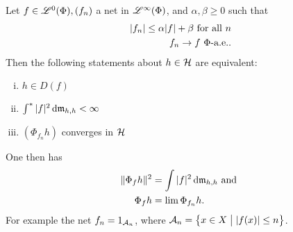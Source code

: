 \begin{lem}
  \label{maintheorem2}
Let $f \in \mathscr{L}^0(\Phi), (f_n)$ a net in $\mathscr{L}^\infty (\Phi)$, and $\alpha, \beta \geq 0$ such that
 \begin{align*}
   | f_n | \leq \alpha |f| + \beta \text{ for all } n \\
   f_n \to f ~\Phi\text{-a.e.}.
 \end{align*}
Then the following statements about $h \in \mathcal{H}$ are equivalent:
\begin{enumerate}[(i)]
 \item $h \in D(f)$
 \item $\int ^{*} | f| ^2 \operatorname{d}\! \mathfrak{m}_{h,h} < \infty$
 \item $(\Phi_{f_n}h)$ converges in $ \mathcal{H}$
\end{enumerate}
One then has
\begin{align*}
  \| \Phi_f h \| ^2 &= \int |f|^2 \operatorname{d}\! \mathfrak{m}_{h, h } \text{ and }\\
  \Phi_{f }h &= \lim \Phi_{f_n} h.
\end{align*}
For example the net $f_n = 1_{\mathcal{A}_n}$, where $\mathcal{A}_n = \left\lbrace x \in X \bigm | | f(x) | \leq n \right\rbrace$.
\end{lem}


